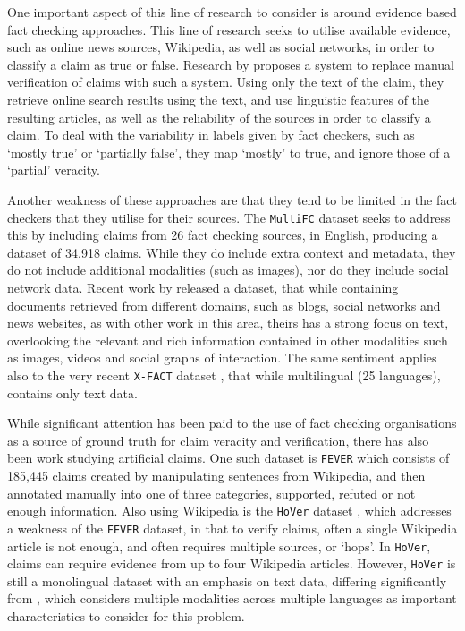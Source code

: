 \documentclass[sigconf,natbib=true,anonymous=false,nonacm]{acmart}
\begin{document}
One important aspect of this line of research to consider is around evidence
based fact checking approaches. This line of research seeks to utilise
available evidence, such as online news sources, Wikipedia, as well as social
networks, in order to classify a claim as true or false. Research by
\citet{popat20216} proposes a system to replace manual verification of claims
with such a system. Using only the text of the claim, they retrieve online
search results using the text, and use linguistic features of the resulting
articles, as well as the reliability of the sources in order to classify a
claim. To deal with the variability in labels given by fact checkers, such as
`mostly true' or `partially false', they map `mostly' to true, and ignore those
of a `partial' veracity.

Another weakness of these approaches are that they tend to be limited in the
fact checkers that they utilise for their sources. The \texttt{MultiFC} dataset
\citep{Augenstein2019MultiFC} seeks to address this by including claims from 26
fact checking sources, in English, producing a dataset of 34,918 claims. While
they do include extra context and metadata, they do not include additional
modalities (such as images), nor do they include social network data. Recent
work by \citet{hanselowski2019} released a dataset, that while containing
documents retrieved from different domains, such as blogs, social networks and
news websites, as with other work in this area, theirs has a strong focus on
text, overlooking the relevant and rich information contained in other
modalities such as images, videos and social graphs of interaction. The same
sentiment applies also to the very recent \texttt{X-FACT} dataset
\citep{gupta2021xfact}, that while multilingual (25 languages), contains only
text data.

While significant attention has been paid to the use of fact checking
organisations as a source of ground truth for claim veracity and verification,
there has also been work studying artificial claims. One such dataset is
\texttt{FEVER} \citep{thorne2018fever} which consists of 185,445 claims created
by manipulating sentences from Wikipedia, and then annotated manually into one
of three categories, supported, refuted or not enough information. Also using
Wikipedia is the \texttt{HoVer} dataset \citep{jiang2020hover}, which addresses
a weakness of the \texttt{FEVER} dataset, in that to verify claims, often a
single Wikipedia article is not enough, and often requires multiple sources, or
`hops'. In \texttt{HoVer}, claims can require evidence from up to four
Wikipedia articles. However, \texttt{HoVer} is still a monolingual dataset with
an emphasis on text data, differing significantly from \datasetname, which
considers multiple modalities across multiple languages as important
characteristics to consider for this problem.
\end{document}
